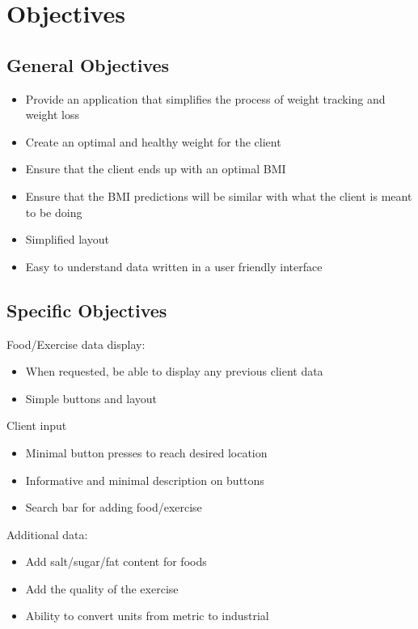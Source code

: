
\section{Objectives}

\subsection{General Objectives}

\begin{itemize}
\item Provide an application that simplifies the process of weight tracking and weight loss
\item Create an optimal and healthy weight for the client
\item Ensure that the client ends up with an optimal BMI
\item Ensure that the BMI predictions will be similar with what the client is meant to be doing
\item Simplified layout
\item Easy to understand data written in a user friendly interface
\end{itemize}

\subsection{Specific Objectives}
Food/Exercise data display:

\begin{itemize}
\item When requested, be able to display any previous client data
\item Simple buttons and layout 
\end{itemize}

Client input
\begin{itemize}
\item Minimal button presses to reach desired location
\item Informative and minimal description on buttons
\item Search bar for adding food/exercise
\end{itemize}

Additional data:
\begin{itemize}
\item Add salt/sugar/fat content for foods
\item Add the quality of the exercise
\item Ability to convert units from metric to industrial
\end{itemize}

